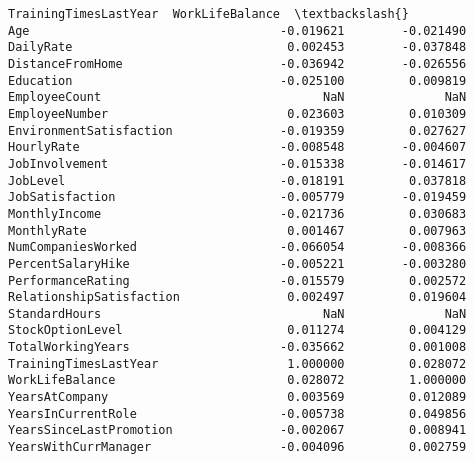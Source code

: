 \documentclass[11pt]{article}
\begin{document}
\begin{Verbatim}[commandchars=\\\{\}]
                          TrainingTimesLastYear  WorkLifeBalance  \textbackslash{}
Age                                   -0.019621        -0.021490   
DailyRate                              0.002453        -0.037848   
DistanceFromHome                      -0.036942        -0.026556   
Education                             -0.025100         0.009819   
EmployeeCount                               NaN              NaN   
EmployeeNumber                         0.023603         0.010309   
EnvironmentSatisfaction               -0.019359         0.027627   
HourlyRate                            -0.008548        -0.004607   
JobInvolvement                        -0.015338        -0.014617   
JobLevel                              -0.018191         0.037818   
JobSatisfaction                       -0.005779        -0.019459   
MonthlyIncome                         -0.021736         0.030683   
MonthlyRate                            0.001467         0.007963   
NumCompaniesWorked                    -0.066054        -0.008366   
PercentSalaryHike                     -0.005221        -0.003280   
PerformanceRating                     -0.015579         0.002572   
RelationshipSatisfaction               0.002497         0.019604   
StandardHours                               NaN              NaN   
StockOptionLevel                       0.011274         0.004129   
TotalWorkingYears                     -0.035662         0.001008   
TrainingTimesLastYear                  1.000000         0.028072   
WorkLifeBalance                        0.028072         1.000000   
YearsAtCompany                         0.003569         0.012089   
YearsInCurrentRole                    -0.005738         0.049856   
YearsSinceLastPromotion               -0.002067         0.008941   
YearsWithCurrManager                  -0.004096         0.002759   


\end{Verbatim}
\end{document}

